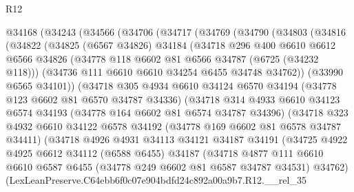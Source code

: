 \begin{lexlean}{R12}
\begin{coremodule}
  @34168
    (@34243
      (@34566
        (@34706
          (@34717
            (@34769
              (@34790
                (@34803
                  (@34816
                    (@34822
                      (@34825
                        (@6567 @34826)
                        @34184
                        (@34718
                          @296
                          @400
                          @6610
                          @6612
                          @6566
                          @34826
                          (@34778 @118 @6602 @81 @6566 @34787 (@6725 (@34232 @118)))
                          (@34736 @111 @6610 @6610 @34254 @6455 @34748 @34762))
                        (@33990 @6565 @34101))
                      (@34718
                        @305
                        @4934
                        @6610
                        @34124
                        @6570
                        @34194
                        (@34778 @123 @6602 @81 @6570 @34787 @34336)
                        (@34718
                          @314
                          @4933
                          @6610
                          @34123
                          @6574
                          @34193
                          (@34778 @164 @6602 @81 @6574 @34787 @34396)
                          (@34718
                            @323
                            @4932
                            @6610
                            @34122
                            @6578
                            @34192
                            (@34778 @169 @6602 @81 @6578 @34787 @34411)
                            (@34718
                              @4926
                              @4931
                              @34113
                              @34121
                              @34187
                              @34191
                              (@34725
                                @4922
                                @4925
                                @6612
                                @34112
                                (@6588 @6455)
                                @34187
                                (@34718
                                  @4877
                                  @111
                                  @6610
                                  @6610
                                  @6587
                                  @6455
                                  (@34778 @249 @6602 @81 @6587 @34787 @34531)
                                  @34762)
                                (LexLeanPreserve.C64ebb6f0c07e904bdfd24c892a00a9b7.R12.__rel_35

\end{coremodule}
\end{lexlean}
